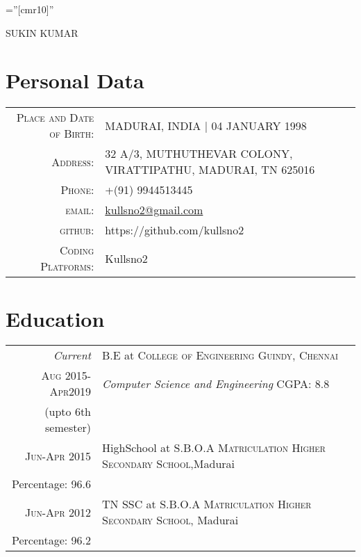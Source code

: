 \documentclass[a4paper,10pt]{article}
\begin{document}

\pagestyle{empty} %

\font\fb=''[cmr10]'' %

\par{\centering
		{\Huge SUKIN \textsc{KUMAR}
	}\bigskip\par}

\section{Personal Data}

\begin{tabular}{rl}
    \textsc{Place and Date of Birth:} & MADURAI, INDIA  | 04 JANUARY 1998 \\
    \textsc{Address:}   & 32 A/3, MUTHUTHEVAR COLONY, VIRATTIPATHU, MADURAI, TN 625016\\
    \textsc{Phone:}     & +(91) 9944513445\\
    \textsc{email:}     & 
    \href{mailto:kullsno2@gmail.com}{kullsno2@gmail.com}\\
    \textsc{github:}    & https://github.com/kullsno2\\ 
    \textsc{Coding Platforms:}   & Kullsno2
\end{tabular}

\section{Education}
\begin{tabular}{r|p{11cm}}
 \emph{Current} & B.E at \textsc{College of Engineering Guindy, Chennai}\\\textsc{Aug 2015-Apr2019}&\emph{Computer Science and Engineering} \qquad \qquad \qquad \qquad \quad CGPA: 8.8\\{}\hfill(upto 6th semester)\multicolumn{2}{c}{} \\
 \textsc{Jun-Apr 2015} & HighSchool at \textsc{S.B.O.A Matriculation Higher Secondary School},Madurai\\    \hfill Percentage: 96.6\multicolumn{2}{c}{} \\
\textsc{Jun-Apr 2012} & TN SSC at \textsc{ S.B.O.A Matriculation Higher Secondary School}, Madurai\\{}\hfill Percentage: 96.2\multicolumn{2}{c}{} 
\end{tabular}
\end{document}
